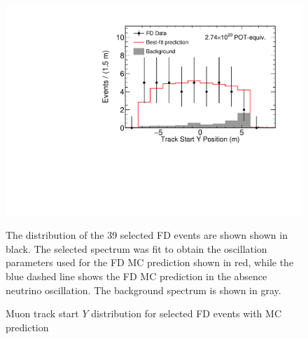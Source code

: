 \begin{figure}
\begin{center}
\includegraphics[width=\textwidth]{figures/results/fd_data_mc_numi_plots/trkStartY_unblind.pdf}
\end{center}
\caption{ Muon track start $Y$ distribution for selected FD events with MC prediction }{
The distribution of the 39 selected FD events are shown shown in black.
The selected spectrum was fit to obtain the oscillation parameters used
for the FD MC prediction shown in red, while
the blue dashed line shows the FD MC prediction in the absence neutrino
oscillation.
The background spectrum is shown in gray.
}
\label{trkStartY_unblind}

\end{figure}




